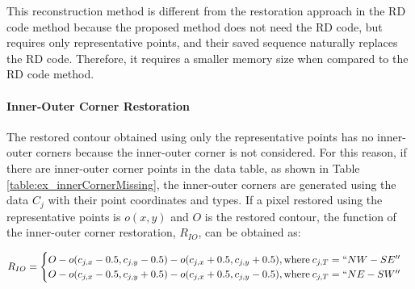 \documentclass[sensors,article,accept,moreauthors,pdftex,10pt,a4paper]{mdpi}
\begin{document}
This reconstruction method is different from the restoration approach in the RD code method because the proposed method does not need the RD code, but requires only representative points, and their saved sequence naturally replaces the RD code. Therefore, it requires a smaller memory size when compared to the RD code method.

\paragraph{Inner-Outer Corner Restoration}


The restored contour obtained using only the representative points has no inner-outer corners because the inner-outer corner is not considered. For this reason, if there are inner-outer corner points in the data table, as shown in Table \ref{table:ex_innerCornerMissing}, the inner-outer corners are generated using the data $C_j$ with their point coordinates and types. If a pixel restored using the representative points is $o(x, y)$ and $O$ is the restored contour, the function of the inner-outer corner restoration, $R_{IO}$, can be obtained as:

\begin{equation}
R_{IO} = \begin{cases}
O - o(c_{j,x} - 0.5, c_{j,y} - 0.5) - o(c_{j,x} + 0.5, c_{j,y} + 0.5), \text{where\:} c_{j,T} = ``NW-SE'' \\
O - o(c_{j,x} - 0.5, c_{j,y} + 0.5) - o(c_{j,x} + 0.5, c_{j,y} - 0.5), \text{where\:} c_{j,T} = ``NE-SW'' \\
\end{cases}
\label{eq:r_io}
\end{equation}




\end{document}
